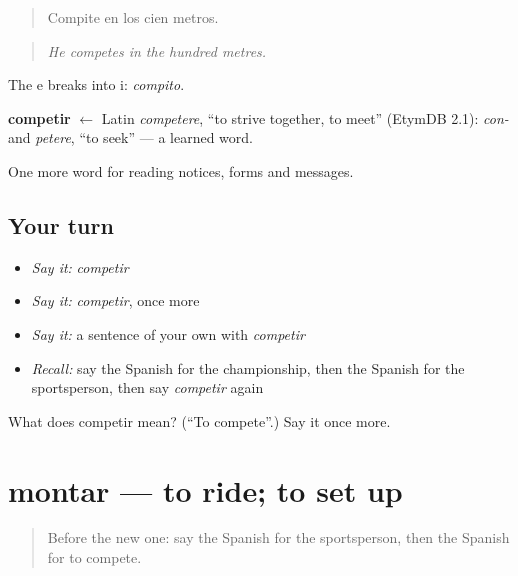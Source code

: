 \begin{quote}
Compite en los cien metros.
\end{quote}

\begin{quote}
\emph{He competes in the hundred metres.}
\end{quote}

The e breaks into i: \emph{compito}.

\begin{cousinweb}
\textbf{competir} $\leftarrow$ Latin \emph{competere}, \textquotedblleft{}to strive together, to meet\textquotedblright{} (EtymDB 2.1): \emph{con-} and \emph{petere}, \textquotedblleft{}to seek\textquotedblright{} — a learned word.
\end{cousinweb}

\begin{grammarlens}[title={What you've built}]
One more word for reading notices, forms and messages.
\end{grammarlens}

\subsection*{Your turn}
\begin{itemize}
\raggedright
  \item \emph{Say it:} \emph{competir}
  \item \emph{Say it:} \emph{competir}, once more
  \item \emph{Say it:} a sentence of your own with \emph{competir}
  \item \emph{Recall:} say the Spanish for the championship, then the Spanish for the sportsperson, then say \emph{competir} again
\end{itemize}

\begin{tcolorbox}[breakable,colback=teal!4,colframe=teal!35!black,title={Before you move on}]
What does competir mean? (\textquotedblleft{}To compete\textquotedblright{}.) Say it once more.
\end{tcolorbox}
\section[montar]{montar — to ride; to set up}

\label{lesson:ES-C498-montar}



\begin{quote}
Before the new one: say the Spanish for the sportsperson, then the Spanish for to compete.
\end{quote}

